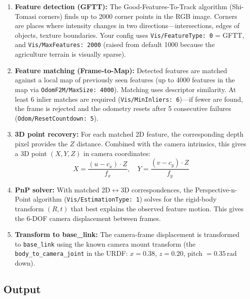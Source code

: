 \documentclass[11pt,a4paper]{article}
\begin{document}
\begin{enumerate}[itemsep=4pt]
  \item \textbf{Feature detection (GFTT):} The Good-Features-To-Track
        algorithm (Shi-Tomasi corners) finds up to 2000 corner points in the
        RGB image. Corners are places where intensity changes in two
        directions---intersections, edges of objects, texture boundaries.
        Your config uses \texttt{Vis/FeatureType: 0} = GFTT, and
        \texttt{Vis/MaxFeatures: 2000} (raised from default 1000 because
        the agriculture terrain is visually sparse).

  \item \textbf{Feature matching (Frame-to-Map):} Detected features are
        matched against a local map of previously seen features (up to 4000
        features in the map via \texttt{OdomF2M/MaxSize: 4000}). Matching
        uses descriptor similarity. At least 6 inlier matches are required
        (\texttt{Vis/MinInliers: 6})---if fewer are found, the frame is
        rejected and the odometry resets after 5 consecutive failures
        (\texttt{Odom/ResetCountdown: 5}).

  \item \textbf{3D point recovery:} For each matched 2D feature, the
        corresponding depth pixel provides the $Z$ distance. Combined with
        the camera intrinsics, this gives a 3D point $(X, Y, Z)$ in camera
        coordinates:
        \begin{equation}
          X = \frac{(u - c_x) \cdot Z}{f_x}, \quad
          Y = \frac{(v - c_y) \cdot Z}{f_y}
        \end{equation}

  \item \textbf{PnP solver:} With matched 2D$\leftrightarrow$3D
        correspondences, the Perspective-n-Point algorithm
        (\texttt{Vis/EstimationType: 1}) solves for the rigid-body transform
        $(R, t)$ that best explains the observed feature motion. This gives
        the 6-DOF camera displacement between frames.

  \item \textbf{Transform to base\_link:} The camera-frame displacement is
        transformed to \texttt{base\_link} using the known camera mount
        transform (the \texttt{body\_to\_camera\_joint} in the URDF: $x=0.38$,
        $z=0.20$, pitch $= 0.35$\,rad down).
\end{enumerate}

\subsection{Output}
\end{document}
